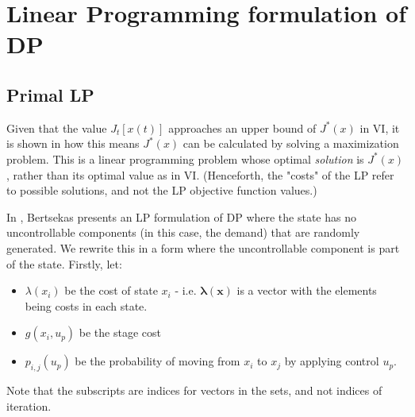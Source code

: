 \documentclass[conference]{IEEEtran}
\begin{document}



\section{Linear Programming formulation of DP}
\subsection{Primal LP}
Given that the value $J_{t}[x(t)]$ approaches an upper bound of $J^{*}(x)$ in VI, it is shown in \cite{Bertsekas:2007:DPO:1396348} how this means $J^{*}(x)$ can be calculated by solving a maximization problem. This is a linear programming problem whose optimal \textit{solution} is $J^{*}(x)$, rather than its optimal value as in VI. (Henceforth, the "costs" of the LP refer to possible solutions, and not the LP objective function values.)


In \cite{Bertsekas:2007:DPO:1396348}, Bertsekas presents an LP formulation of DP where the state has no uncontrollable components (in this case, the demand) that are randomly generated. We rewrite this in a form where the uncontrollable component is part of the state. Firstly, let:
\begin{itemize}
	\item $\lambda(x_{i})$ be the cost of state $x_{i}$ - i.e. $\boldsymbol{\lambda(x)}$ is a vector with the elements being costs in each state.
	\item $g(x_{i},u_{p})$ be the stage cost
	\item $p_{i,j}(u_{p})$ be the probability of moving from $x_{i}$ to $x_{j}$ by applying control $u_{p}$.
\end{itemize} Note that the subscripts are indices for vectors in the sets, and not indices of iteration.
\end{document}

